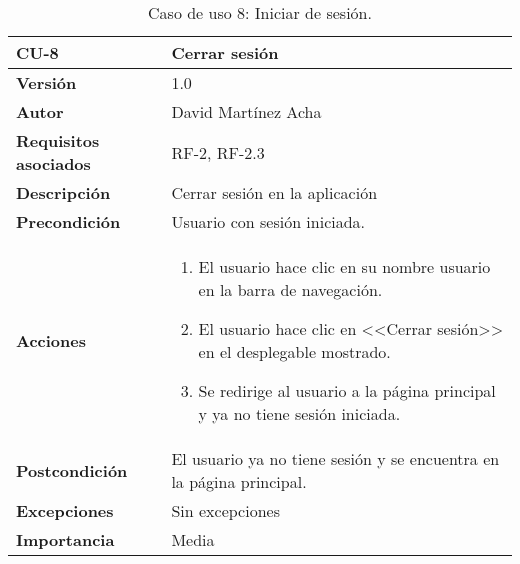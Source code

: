 \begin{table}[p]
	\centering
	\begin{tabularx}{\linewidth}{ p{} p{} }
		\toprule
		\textbf{CU-8}    & \textbf{Cerrar sesión}\\
		\toprule
		\textbf{Versión}              & 1.0    \\
		\textbf{Autor}                & David Martínez Acha \\
		\textbf{Requisitos asociados} & RF-2, RF-2.3 \\
		\textbf{Descripción}          & Cerrar sesión en la aplicación \\
		\textbf{Precondición}         & Usuario con sesión iniciada. \\
		\textbf{Acciones}             &
		\begin{enumerate}
			\def\labelenumi{\arabic{enumi}.}
			\tightlist
			\item El usuario hace clic en su nombre usuario en la barra de navegación.
			\item El usuario hace clic en <<Cerrar sesión>> en el desplegable mostrado.
			\item Se redirige al usuario a la página principal y ya no tiene sesión iniciada.
		\end{enumerate}\\
		\textbf{Postcondición}        & El usuario ya no tiene sesión y se encuentra en la página principal. \\
		\textbf{Excepciones}          & Sin excepciones \\
		\textbf{Importancia}          & Media \\
		\bottomrule
	\end{tabularx}
	\caption{Caso de uso 8: Iniciar de sesión.}
\end{table}

